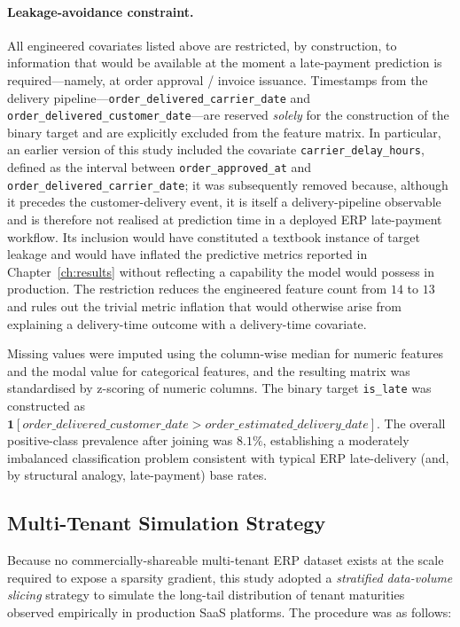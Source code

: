 \paragraph{Leakage-avoidance constraint.}
\label{para:leakage-avoidance}
All engineered covariates listed above are restricted, by construction, to
information that would be available at the moment a late-payment prediction
is required---namely, at order approval / invoice issuance. Timestamps from
the delivery pipeline---\texttt{order\_delivered\_carrier\_date} and
\texttt{order\_delivered\_customer\_date}---are reserved \emph{solely} for
the construction of the binary target and are explicitly excluded from the
feature matrix. In particular, an earlier version of this study included
the covariate \texttt{carrier\_delay\_hours}, defined as the interval
between \texttt{order\_approved\_at} and
\texttt{order\_delivered\_carrier\_date}; it was subsequently removed
because, although it precedes the customer-delivery event, it is itself a
delivery-pipeline observable and is therefore not realised at prediction
time in a deployed ERP late-payment workflow. Its inclusion would have
constituted a textbook instance of target leakage and would have inflated
the predictive metrics reported in Chapter~\ref{ch:results} without
reflecting a capability the model would possess in production. The
restriction reduces the engineered feature count from $14$ to $13$ and
rules out the trivial metric inflation that would otherwise arise from
explaining a delivery-time outcome with a delivery-time covariate.

Missing values were imputed using the column-wise median for numeric
features and the modal value for categorical features, and the resulting
matrix was standardised by z-scoring of numeric columns. The binary target
\texttt{is\_late} was constructed as
$\mathbf{1}[\textit{order\_delivered\_customer\_date} >
\textit{order\_estimated\_delivery\_date}]$. The overall positive-class
prevalence after joining was $8.1\%$, establishing a moderately imbalanced
classification problem consistent with typical ERP late-delivery (and, by structural analogy, late-payment) base rates.

\subsection{Multi-Tenant Simulation Strategy}
\label{subsec:multi-tenant-sim}

Because no commercially-shareable multi-tenant ERP dataset exists at the
scale required to expose a sparsity gradient, this study adopted a
\emph{stratified data-volume slicing} strategy to simulate the long-tail
distribution of tenant maturities observed empirically in production SaaS
platforms. The procedure was as follows:

